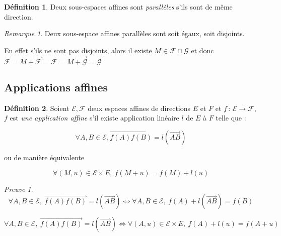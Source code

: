 \documentclass[]{article}
\theoremstyle{remark}
\newtheorem{myrem}{Remarque}
\newtheorem{myproof}{Preuve}
\theoremstyle{definition}
\newtheorem{mydef}{Définition}
\newcommand{\funcshort}[3]{
#1 \, : \, #2 \longrightarrow #3
}
\begin{document}
\begin{mydef}
	Deux sous-espaces affines sont \textit{parallèles} s'ils sont de même direction.
\end{mydef}

\begin{myrem}
	Deux sous-espace affines parallèles sont soit égaux, soit disjoints.
	
	En effet s'ils ne sont pas disjoints, alors il existe $M \in \mathcal{F} \cap \mathcal{G}$ et donc $\mathcal{F} = M + \overrightarrow{\mathcal{F}} = \mathcal{F} = M + \overrightarrow{\mathcal{G}} = \mathcal{G}$
\end{myrem}

\subsection{Applications affines}

\begin{mydef}
	Soient $\mathcal{E}, \mathcal{F}$ deux espaces affines de directions $E$ et $F$ et $\funcshort{f}{\mathcal{E}}{\mathcal{F}}$, $f$ est \textit{une application affine} s'il existe application linéaire $l$ de $E$ à $F$ telle que :
	
	$$\forall A, B \in \mathcal{E}, \overrightarrow{f(A) f(B)} = l(\overrightarrow{AB})$$
	
	ou de manière équivalente
	
	$$\forall (M, u) \in \mathcal{E} \times E, ~ f(M + u) = f(M) + l(u)$$
\end{mydef}

\begin{myproof}
	$$\forall A, B \in \mathcal{E}, ~ \overrightarrow{f(A)f(B)} = l(\overrightarrow{AB}) \Longleftrightarrow \forall A, B \in \mathcal{E}, ~ f(A) + l(\overrightarrow{AB}) = f(B)$$

	$$\forall A, B \in \mathcal{E}, ~ \overrightarrow{f(A)f(B)} = l(\overrightarrow{AB}) \Longleftrightarrow \forall (A, u) \in \mathcal{E} \times E, ~ f(A) + l(u) = f(A+u)$$
\end{myproof}
\end{document}
